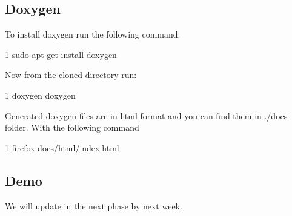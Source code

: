 \subsection*{Doxygen}

To install doxygen run the following command\+:


\begin{DoxyCode}
1 sudo apt-get install doxygen
\end{DoxyCode}
 Now from the cloned directory run\+:


\begin{DoxyCode}
1 doxygen doxygen
\end{DoxyCode}


Generated doxygen files are in html format and you can find them in ./docs folder. With the following command


\begin{DoxyCode}
1 firefox docs/html/index.html
\end{DoxyCode}


\subsection*{Demo}

We will update in the next phase by next week. 